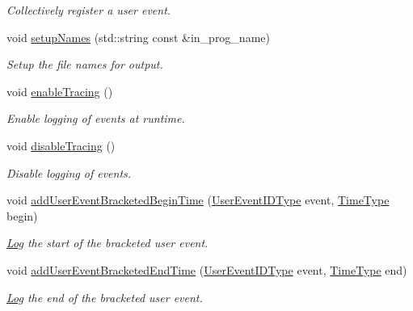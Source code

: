 \begin{DoxyCompactItemize}
\begin{DoxyCompactList}\small\item\em Collectively register a user event. \end{DoxyCompactList}\item 
void \hyperlink{structvt_1_1trace_1_1_trace_lite_a1f8e52289799bcd6b469b20be7d1e149}{setup\+Names} (std\+::string const \&in\+\_\+prog\+\_\+name)
\begin{DoxyCompactList}\small\item\em Setup the file names for output. \end{DoxyCompactList}\item 
void \hyperlink{structvt_1_1trace_1_1_trace_lite_a99c538b6e3cd2521bba5cba161ac4240}{enable\+Tracing} ()
\begin{DoxyCompactList}\small\item\em Enable logging of events at runtime. \end{DoxyCompactList}\item 
void \hyperlink{structvt_1_1trace_1_1_trace_lite_ac494fd6858647fd548b6554cf066568b}{disable\+Tracing} ()
\begin{DoxyCompactList}\small\item\em Disable logging of events. \end{DoxyCompactList}\item 
void \hyperlink{structvt_1_1trace_1_1_trace_lite_aa5b73294a6beaa3302f73ba8098ede8c}{add\+User\+Event\+Bracketed\+Begin\+Time} (\hyperlink{namespacevt_1_1trace_a5908920d051c144c89f17c69ed262350}{User\+Event\+I\+D\+Type} event, \hyperlink{namespacevt_a2b9f28078dc309ad0706b69ded743e69}{Time\+Type} begin)
\begin{DoxyCompactList}\small\item\em \hyperlink{structvt_1_1trace_1_1_log}{Log} the start of the bracketed user event. \end{DoxyCompactList}\item 
void \hyperlink{structvt_1_1trace_1_1_trace_lite_af3eb80add2cb5d24aa6f0716e89eebbe}{add\+User\+Event\+Bracketed\+End\+Time} (\hyperlink{namespacevt_1_1trace_a5908920d051c144c89f17c69ed262350}{User\+Event\+I\+D\+Type} event, \hyperlink{namespacevt_a2b9f28078dc309ad0706b69ded743e69}{Time\+Type} end)
\begin{DoxyCompactList}\small\item\em \hyperlink{structvt_1_1trace_1_1_log}{Log} the end of the bracketed user event. \end{DoxyCompactList}\item 

\end{DoxyCompactItemize}
